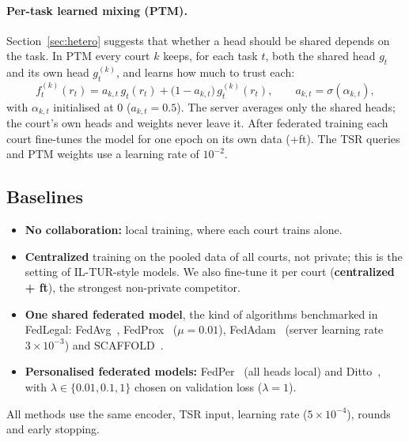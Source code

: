 \documentclass[11pt,a4paper]{article}
\begin{document}
\paragraph{Per-task learned mixing (PTM).} Section~\ref{sec:hetero} suggests that whether a head should
be shared depends on the task. In PTM every court $k$ keeps, for each task $t$, both the shared head
$g_t$ and its own head $g^{(k)}_t$, and learns how much to trust each:
\begin{equation}
f^{(k)}_t(r_t) = a_{k,t}\, g_t(r_t) + \bigl(1-a_{k,t}\bigr)\, g^{(k)}_t(r_t), \qquad a_{k,t}=\sigma(\alpha_{k,t}),
\end{equation}
with $\alpha_{k,t}$ initialised at 0 ($a_{k,t}=0.5$). The server averages only the shared heads; the
court's own heads and weights never leave it. After federated training each court fine-tunes the model
for one epoch on its own data (+ft). The TSR queries and PTM weights use a learning rate of $10^{-2}$.

\subsection{Baselines}
\begin{itemize}
  \item \textbf{No collaboration:} local training, where each court trains alone.
  \item \textbf{Centralized} training on the pooled data of all courts, not private; this is the
        setting of IL-TUR-style models. We also fine-tune it per court (\textbf{centralized + ft}), the
        strongest non-private competitor.
  \item \textbf{One shared federated model}, the kind of algorithms benchmarked in FedLegal:
        FedAvg~\cite{mcmahan2017communication}, FedProx~\cite{li2020federated} ($\mu=0.01$),
        FedAdam~\cite{reddi2021adaptive} (server learning rate $3\times10^{-3}$) and
        SCAFFOLD~\cite{karimireddy2020scaffold}.
  \item \textbf{Personalised federated models:} FedPer~\cite{arivazhagan2019fedper} (all heads local)
        and Ditto~\cite{li2021ditto}, with $\lambda\in\{0.01, 0.1, 1\}$ chosen on validation loss
        ($\lambda=1$).
\end{itemize}
All methods use the same encoder, TSR input, learning rate ($5\times10^{-4}$), rounds and early stopping.
\end{document}
